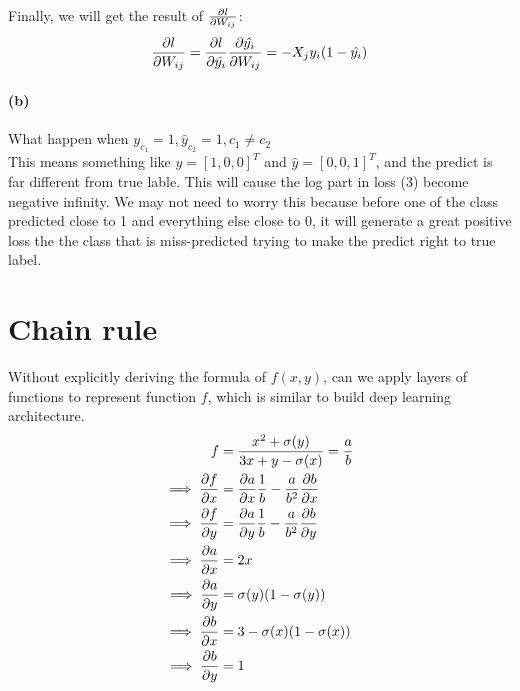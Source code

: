 \documentclass{article}
\begin{document}
Finally, we will get the result of ${\partial l\over \partial W_{ij}}$:
\begin{equation}
{\partial l\over \partial W_{ij}} = {\partial l \over \partial \hat{y_i}} {\partial \hat{y_i} \over \partial W_{ij}} = -X_jy_i(1- \hat{y_i})
\end{equation}
\paragraph{(b)} What happen when $y_{c_1}=1, \hat{y}_{c_2}=1, c_1 \neq c_2$\\
This means something like $y = [1, 0, 0]^T$ and $\hat{y} = [0,0,1]^T$, and the predict is far different from true lable. This will cause the log part in loss (3) become negative infinity. We may not need to worry this because before one of the class predicted close to 1 and everything else close to 0, it will generate a great positive loss the the class that is miss-predicted trying to make the predict right to true label.
\section{Chain rule}
Without explicitly deriving the formula of $f(x, y)$, can we apply layers of functions to represent function $f$, which is similar to build deep learning architecture.
\begin{equation}
\begin{aligned}
f &= {{x^2+\sigma (y)}\over 3x + y - \sigma(x)} = {a \over b} \\
\implies {\partial f \over \partial x} &= {\partial a \over \partial x}{1\over b} - {a\over b^2}{\partial b \over \partial x} \\
\implies {\partial f \over \partial y} &= {\partial a \over \partial y}{1\over b} - {a\over b^2}{\partial b \over \partial y} \\
\implies {\partial a \over \partial x} &= 2x \\
\implies {\partial a \over \partial y} &= \sigma(y)(1-\sigma(y)) \\
\implies {\partial b \over \partial x} &= 3-\sigma(x)(1-\sigma(x)) \\
\implies {\partial b \over \partial y} &= 1 \\
\end{aligned}
\end{equation}
\end{document}
